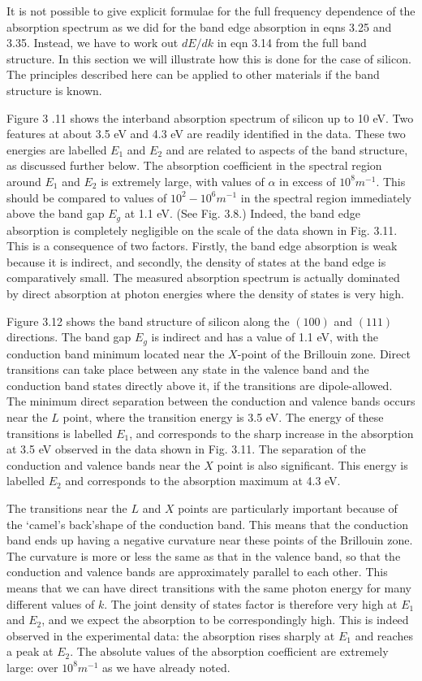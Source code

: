 \documentclass[12pt]{book}
\begin{document}
It is not possible to give explicit formulae for the full frequency dependence of the absorption spectrum as we did for the band edge absorption in eqns 3.25 and 3.35. Instead, we have to work out $dE/dk$ in eqn 3.14 from the full band structure. In this section we will illustrate how this is done for the case of silicon. The principles described here can be applied to other materials if the band structure is known.

Figure 3 .11 shows the interband absorption spectrum of silicon up to 10 eV. Two features at about 3.5 eV and 4.3 eV are readily identified in the data. These two energies are labelled $E_1$ and $E_2$ and are related to aspects of the band structure, as discussed further below. The absorption coefficient in the spectral region around $E_1$ and $E_2$ is extremely large, with values of $\alpha$ in excess of $10^8 m^{-1}$. This should be compared to values of $10^2-10^6 m^{-1}$ in the spectral region immediately above the band gap $E_g$ at 1.1 eV. (See Fig. 3.8.) Indeed, the band edge absorption is completely negligible on the scale of the data shown in Fig. 3.11. This is a consequence of two factors. Firstly, the band edge absorption is weak because it is indirect, and secondly, the density of states at the band edge is comparatively small. The measured absorption spectrum is actually dominated by direct absorption at photon energies where the density
of states is very high.

Figure 3.12 shows the band structure of silicon along the $(100)$ and $(111)$ directions. The band gap $E_g$ is indirect and has a value of 1.1 eV, with the conduction band minimum located near the $X$-point of the Brillouin zone. Direct transitions can take place between any state in the valence band and the conduction band states directly above it, if the transitions are dipole-allowed. The minimum direct separation between the conduction and valence bands occurs near the $L$ point, where the transition energy is 3.5 eV. The energy of these transitions is labelled $E_1$, and corresponds to the sharp increase in the absorption at 3.5 eV observed in the data shown in Fig. 3.11. The separation of the conduction and valence bands near the $X$ point is also significant. This energy is labelled $E_2$ and corresponds to the absorption maximum at 4.3 eV.

The transitions near the $L$ and $X$ points are particularly important because of the \lq camel's back\rq shape of the conduction band. This means that the conduction band ends up having a negative curvature near these points of the Brillouin zone. The curvature is more or less the same as that in the valence band, so that the conduction and valence bands are approximately parallel to each other. This means that we can have direct transitions with the same photon energy for many different values of $k$. The joint density of states factor is therefore very high at $E_1$ and $E_2$, and we expect the absorption to be correspondingly high. This is indeed observed in the experimental data: the absorption rises sharply at $E_1$ and reaches a peak at $E_2$. The absolute values of the absorption coefficient are extremely large: over $10^8 m^{-1}$ as we have already noted.
\end{document}

